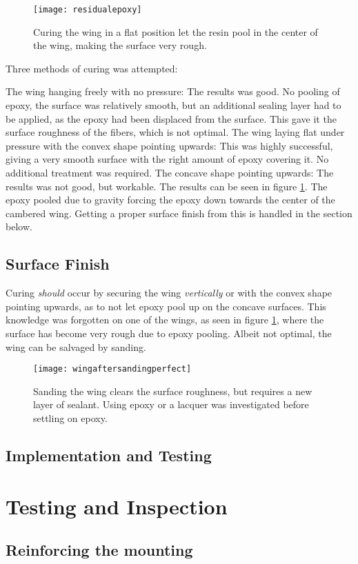     \begin{figure}
      \texttt{[image: residualepoxy]}
      \caption{Curing the wing in a flat position let the resin pool in the center of the wing, making the surface very rough.}
      \label{fig:roughsurface}
    \end{figure}

    Three methods of curing was attempted:

    The wing hanging freely with no pressure: The results was good. No pooling of epoxy, the surface was relatively smooth, but an additional sealing layer had to be applied, as the epoxy had been displaced from the surface. This gave it the surface roughness of the fibers, which is not optimal.
    The wing laying flat under pressure with the convex shape pointing upwards: This was highly successful, giving a very smooth surface with the right amount of epoxy covering it. No additional treatment was required.
    The concave shape pointing upwards: The results was not good, but workable. The results can be seen in figure \ref{fig:roughsurface}. The epoxy pooled due to gravity forcing the epoxy down towards the center of the cambered wing. Getting a proper surface finish from this is handled in the section below.



  \subsection{Surface Finish}

    Curing \emph{should} occur by securing the wing \emph{vertically} or with the convex shape pointing upwards, as to not let epoxy pool up on the concave surfaces. This knowledge was forgotten on one of the wings, as seen in figure \ref{fig:roughsurface}, where the surface has become very rough due to epoxy pooling. Albeit not optimal, the wing can be salvaged by sanding.

    \begin{figure}
      \texttt{[image: wingaftersandingperfect]}
      \caption{Sanding the wing clears the surface roughness, but requires a new layer of sealant. Using epoxy or a lacquer was investigated before settling on epoxy.}
      \label{fig:wingaftersanding}
    \end{figure}

  \subsection{Implementation and Testing}

\section{Testing and Inspection}

  \subsection{Reinforcing the mounting}
